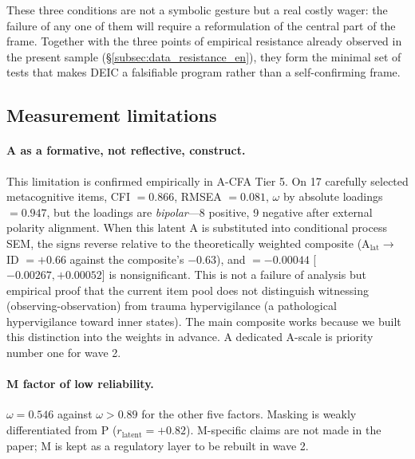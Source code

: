 These three conditions are not a symbolic gesture but a real costly wager: the failure of any one of them will require a reformulation of the central part of the frame. Together with the three points of empirical resistance already observed in the present sample (§\ref{subsec:data_resistance_en}), they form the minimal set of tests that makes DEIC a falsifiable program rather than a self-confirming frame.

\subsection{Measurement limitations}

\paragraph{A as a formative, not reflective, construct.} This limitation is confirmed empirically in A-CFA Tier 5. On 17 carefully selected metacognitive items, CFI $= 0.866$, RMSEA $= 0.081$, $\omega$ by absolute loadings $= 0.947$, but the loadings are \emph{bipolar}---8 positive, 9 negative after external polarity alignment. When this latent A is substituted into conditional process SEM, the signs reverse relative to the theoretically weighted composite (A$_{\mathrm{lat}} \to$ ID $= +0.66$ against the composite's $-0.63$), and \IMM{} $= -0.00044$ [$-0.00267, +0.00052$] is nonsignificant. This is not a failure of analysis but empirical proof that the current item pool does not distinguish witnessing (observing-observation) from trauma hypervigilance (a pathological hypervigilance toward inner states). The main composite works because we built this distinction into the weights in advance. A dedicated A-scale is priority number one for wave 2.

\paragraph{M factor of low reliability.} $\omega = 0.546$ against $\omega > 0.89$ for the other five factors. Masking is weakly differentiated from P ($r_{\mathrm{latent}} = +0.82$). M-specific claims are not made in the paper; M is kept as a regulatory layer to be rebuilt in wave 2.

